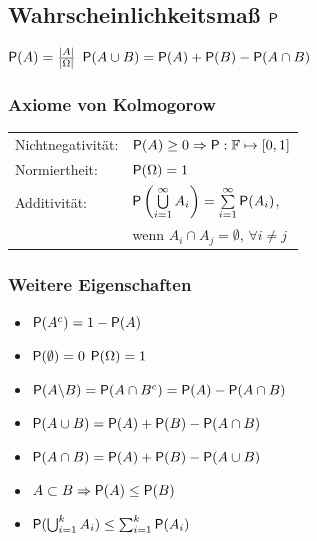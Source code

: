 \documentclass[german,color,6pt]{latex4ei/latex4ei_sheet}
\begin{document}
\begin{sectionbox}
	\subsection{Wahrscheinlichkeitsmaß $\P$}
	$\P(A) = \frac{|A|}{|\Omega|}$ \hfill $\P(A \cup B) = \P(A) + \P(B) - \P(A \cap B)$\\
	\subsubsection{Axiome von Kolmogorow}
	\begin{tabular}{ll}
		Nichtnegativität: & $\P(A) \geq 0 \Ra \P:\mathbb F \mapsto [0,1]$ \\
		Normiertheit: & $\P(\Omega) = 1$ \\
		Additivität: & $\P\left(\bigcup\limits_{i=1}^{\infty} A_i \right) = \sum\limits_{i=1}^{\infty} \P(A_i)$, \\
		& wenn $A_i \cap A_j = \emptyset$, $\forall i \neq j$ \\
	\end{tabular}
	\subsubsection{Weitere Eigenschaften}
	\begin{itemize}	
		\item 	$\P(A^c) = 1 - \P(A)$
		\item 	$\P(\emptyset) = 0$ \qquad $\P(\Omega)=1$
		\item 	$\P(A \backslash B) = \P(A \cap B^c) = \P(A) - \P(A \cap B)$
		\item 	$\P(A \cup B) = \P(A) + \P (B) - \P(A \cap B)$
		\item 	$\P(A \cap B) = \P(A) + \P (B) - \P(A \cup B)$
		\item 	$A \subset B \Rightarrow \P(A) \leq \P(B)$
		\item 	$\P(\bigcup_{i=1}^k A_i) \leq \sum_{i=1}^k \P(A_i)$
	\end{itemize}
	

\end{sectionbox}
\vfill

\end{document}
